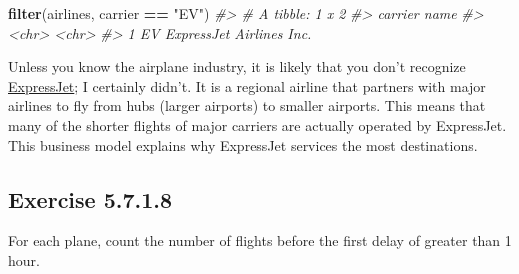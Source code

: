 \documentclass[]{book}
\newenvironment{Shaded}{\begin{snugshade}}{\end{snugshade}}
\newcommand{\CommentTok}[1]{\textcolor[rgb]{0.56,0.35,0.01}{\textit{#1}}}
\newcommand{\DataTypeTok}[1]{\textcolor[rgb]{0.13,0.29,0.53}{#1}}
\newcommand{\DecValTok}[1]{\textcolor[rgb]{0.00,0.00,0.81}{#1}}
\newcommand{\KeywordTok}[1]{\textcolor[rgb]{0.13,0.29,0.53}{\textbf{#1}}}
\newcommand{\NormalTok}[1]{#1}
\newcommand{\OperatorTok}[1]{\textcolor[rgb]{0.81,0.36,0.00}{\textbf{#1}}}
\newcommand{\OtherTok}[1]{\textcolor[rgb]{0.56,0.35,0.01}{#1}}
\newcommand{\StringTok}[1]{\textcolor[rgb]{0.31,0.60,0.02}{#1}}
\theoremstyle{plain}
\theoremstyle{remark}
\begin{document}
\begin{Shaded}
\begin{Highlighting}[]
\KeywordTok{filter}\NormalTok{(airlines, carrier }\OperatorTok{==}\StringTok{ "EV"}\NormalTok{)}
\CommentTok{#> # A tibble: 1 x 2}
\CommentTok{#>   carrier name                    }
\CommentTok{#>   <chr>   <chr>                   }
\CommentTok{#> 1 EV      ExpressJet Airlines Inc.}
\end{Highlighting}
\end{Shaded}

Unless you know the airplane industry, it is likely that you don't recognize \href{https://en.wikipedia.org/wiki/ExpressJet}{ExpressJet}; I certainly didn't.
It is a regional airline that partners with major airlines to fly from hubs (larger airports) to smaller airports.
This means that many of the shorter flights of major carriers are actually operated by ExpressJet.
This business model explains why ExpressJet services the most destinations.

\hypertarget{exercise-5.7.1.8}{%
\subsection*{\texorpdfstring{Exercise {5.7.1.8}}{Exercise 5.7.1.8}}\label{exercise-5.7.1.8}}

For each plane, count the number of flights before the first delay of greater than 1 hour.

\begin{Shaded}
\end{Shaded}
\end{document}
